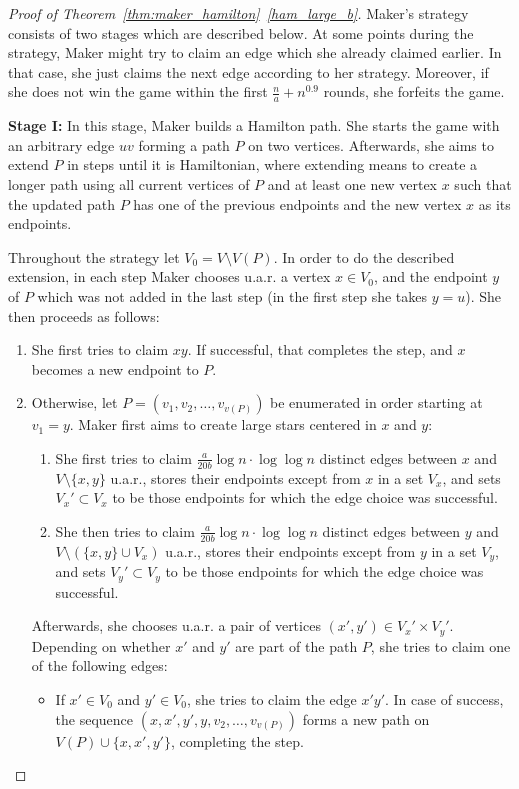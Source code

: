 \documentclass[11pt, a4paper]{article}
\numberwithin{equation}{section}
\numberwithin{figure}{section}
\begin{document}
\begin{proof}[Proof of Theorem~\ref{thm:maker_hamilton}~\ref{ham_large_b}]
Maker's strategy consists of two stages which are described below. 
At some points during the strategy, Maker might try to claim an edge which she already claimed earlier. In that case, she just claims the next edge according to her strategy. Moreover,
if she does not win the game within the first 
$\frac{n}{a} + n^{0.9}$ rounds, she forfeits the game.

\smallskip

\textbf{Stage I:} In this stage, Maker builds a Hamilton path. She starts the game with an arbitrary edge $uv$ forming a path $P$ on two vertices. Afterwards, she aims to extend $P$ in steps until it is Hamiltonian, where extending means to 
create a longer path using all current vertices of $P$ and at least one new vertex $x$ such that the updated path $P$ has one of the previous endpoints and the new vertex $x$ as its endpoints.

Throughout the strategy let $V_0=V\setminus V(P)$.
In order to do the described extension, in each step Maker chooses u.a.r. a vertex $x \in V_0$, and the endpoint $y$ of $P$ which was not added in the last step (in the first step she takes $y=u$). She then proceeds as follows:

\begin{enumerate}
\item[(1)] She first tries to claim $xy$. If successful, that completes the step, and $x$ becomes a new endpoint to $P$.

\item[(2)]
Otherwise, let $P = (v_1,v_2,\ldots,v_{v(P)})$ be enumerated in order starting at $v_1 = y$. 
Maker first aims to create large stars centered in $x$ and $y$:
\begin{enumerate}
\item[(i)] She first tries to claim 
$\frac{a}{20b}\log n\cdot \log\log n$ distinct edges
between $x$ and $V\setminus \{x,y\}$ u.a.r., 
stores their endpoints except from $x$ in a set $V_x$, and sets $V_x'\subset V_x$ to be those endpoints for which the edge choice was successful.
\item[(ii)] She then tries to claim 
$\frac{a}{20b}\log n\cdot \log\log n$ distinct edges
between $y$ and $V\setminus (\{x,y\}\cup V_x)$ u.a.r., 
stores their endpoints except from $y$ in a set $V_y$, and sets $V_y'\subset V_y$ to be those endpoints for which the edge choice was successful.
\end{enumerate}
Afterwards, she chooses u.a.r. a pair of vertices $(x',y') \in V_x' \times V_y'$. Depending on whether $x'$ and $y'$ are part of the path $P$, she tries to claim one of the following edges:
\begin{itemize}
    \item[(a)] If $x' \in V_0$ and $y' \in V_0$, she tries to claim the edge $x'y'$. In case of success, the sequence $(x,x',y',y,v_2,\ldots,v_{v(P)})$ forms a new path on $V(P) \cup \{x,x',y'\}$, completing the step.
    

\end{itemize}
\end{enumerate}
\end{proof}
\end{document}
